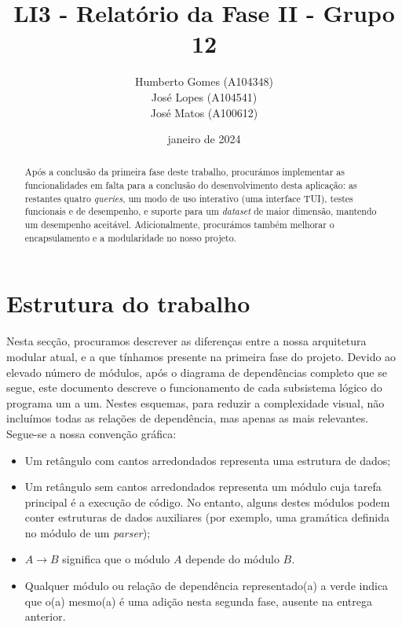 \documentclass[12pt, a4paper]{article}
\title{\textbf{LI3 - Relatório da Fase II - Grupo 12}}
\author{
    Humberto Gomes (A104348) \\
    José Lopes     (A104541) \\
    José Matos     (A100612) \\
}
\date{janeiro de 2024}
\begin{document}
\maketitle
\onehalfspacing
\setlength{\parskip}{\baselineskip}
\setlength{\parindent}{0pt}

\begin{abstract}
    Após a conclusão da primeira fase deste trabalho, procurámos implementar as funcionalidades em
    falta para a conclusão do desenvolvimento desta aplicação: as restantes quatro
    \emph{queries}, um modo de uso interativo (uma interface TUI), testes funcionais e de
    desempenho, e suporte para um \emph{dataset} de maior dimensão, mantendo um desempenho
    aceitável. Adicionalmente, procurámos também melhorar o encapsulamento e a modularidade no
    nosso projeto.
\end{abstract}

\section{Estrutura do trabalho}

Nesta secção, procuramos descrever as diferenças entre a nossa arquitetura modular atual, e a que
tínhamos presente na primeira fase do projeto. Devido ao elevado número de módulos, após o diagrama
de dependências completo que se segue, este documento descreve o funcionamento de cada subsistema
lógico do programa um a um. Nestes esquemas, para reduzir a complexidade visual, não incluímos
todas as relações de dependência, mas apenas as mais relevantes. Segue-se a nossa convenção gráfica:

\begin{itemize}
    \item Um retângulo com cantos arredondados representa uma estrutura de dados;
    \item Um retângulo sem cantos arredondados representa um módulo cuja tarefa principal é a
          execução de código. No entanto, alguns destes módulos podem conter estruturas de dados
          auxiliares (por exemplo, uma gramática definida no módulo de um \emph{parser});
    \item $A \rightarrow B$ significa que o módulo $A$ depende do módulo $B$.
    \item Qualquer módulo ou relação de dependência representado(a) a {\color{ForestGreen}verde}
          indica que o(a) mesmo(a) é uma adição nesta segunda fase, ausente na entrega anterior.
\end{itemize}
\end{document}
